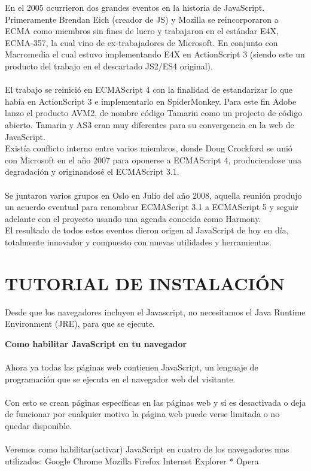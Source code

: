 \documentclass[11pt]{article} %
\begin{document}
En el 2005 ocurrieron dos grandes eventos en la historia de JavaScript. Primeramente Brendan Eich (creador de JS) y Mozilla se reincorporaron a ECMA como miembros sin fines de lucro y trabajaron en el estándar E4X, ECMA-357, la cual vino de ex-trabajadores de Microsoft. En conjunto con Macromedia el cual estuvo implementando E4X en ActionScript 3 (siendo este un producto del trabajo en el descartado JS2/ES4 original).\\\\
El trabajo se reinició en ECMAScript 4 con la finalidad de estandarizar lo que había en ActionScript 3 e implementarlo en SpiderMonkey. Para este fin Adobe lanzo el producto AVM2, de nombre código Tamarin como un projecto de código abierto. Tamarin y AS3 eran muy diferentes para su convergencia en la web de JavaScript.\\
Existía conflicto interno entre varios miembros, donde Doug Crockford se unió con Microsoft en el año 2007 para oponerse a ECMAScript 4, produciendose una degradación y originandosé el ECMAScript 3.1.\\\\
Se juntaron varios grupos en Oslo en Julio del año 2008, aquella reunión produjo un acuerdo eventual para renombrar ECMAScript 3.1 a ECMAScript 5 y seguir adelante con el proyecto usando una agenda conocida como Harmony.\\
El resultado de todos estos eventos dieron origen al JavaScript de hoy en día, totalmente innovador y compuesto con nuevas utilidades y herramientas.\\


\section{TUTORIAL DE INSTALACIÓN}

Desde que los navegadores incluyen el Javascript, no necesitamos el Java Runtime Environment (JRE), para que se ejecute.


\textbf{Como habilitar JavaScript en tu navegador }\\
\\Ahora ya todas las páginas web contienen JavaScript, un lenguaje de programación que se ejecuta en el navegador web del visitante. \\\\
Con esto se crean páginas específicas en las páginas web y si es desactivada o deja de funcionar por cualquier motivo la página web puede verse limitada o no quedar disponible.
\\\\
Veremos como habilitar(activar) JavaScript en cuatro de los navegadores mas utilizados:
\newline
\newline* Google Chrome
\newline* Mozilla Firefox
\newline* Internet Explorer
\newline
* Opera
\newpage
\end{document}
